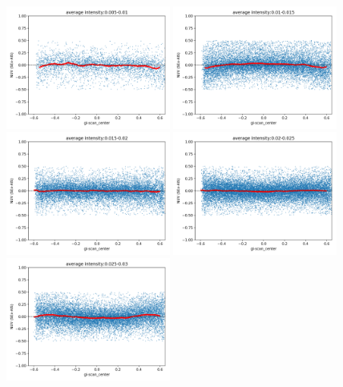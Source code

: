 \documentclass[12pt, preprint]{aastex}
\begin{document}
\begin{figure}[p]
\begin{center}
\includegraphics[width=0.48\textwidth]{figures/cr1}
\includegraphics[width=0.48\textwidth]{figures/cr2}
\includegraphics[width=0.48\textwidth]{figures/cr3}
\includegraphics[width=0.48\textwidth]{figures/cr4}
\includegraphics[width=0.48\textwidth]{figures/cr5}

\end{center}
\end{figure}
\end{document}
